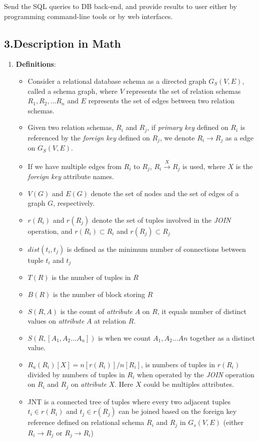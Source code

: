 Send the SQL queries to DB back-end, and provide results to user either by programming command-line tools or by web interfaces.
\begin{center}
{\section*{{\normalsize\bf 3.Description in Math}}}
\end{center}
\begin{enumerate}
\item {\bf Definitions}:
  \begin{itemize}
  \item Consider a relational database schema as a directed graph $G_S(V,E)$, called a schema graph, where $V$ represents the set of relation schemas ${R_1, R_2, ... R_n}$ and $E$ represents the set of edges between two relation schemas.
  \item Given two relation schemas, $R_i$ and $R_j$, if {\it primary key} defined on $R_i$ is referenced by the {\it foreign key} defined on $R_j$, we denote $R_i \rightarrow R_j$ as a edge on $G_S(V,E)$.
  \item If we have multiple edges from $R_i$ to $R_j$, $R_i \stackrel{X}{\longrightarrow} R_j$ is used, where $X$ is the {\it foreign key} attribute names.
  \item $V(G)$ and $E(G)$ denote the set of nodes and the set of edges of a graph $G$, respectively.
  \item $r(R_i)$ and $r(R_j)$ denote the set of tuples involved in the {\it JOIN} operation, and $r(R_i) \subset R_i$ and $r(R_j) \subset R_j$
  \item $dist(t_i,t_j)$ is defined as the minimum number of connections between tuple $t_i$ and $t_j$
  \item $T(R)$ is the number of tuples in $R$
  \item $B(R)$ is the number of block storing $R$
  \item $S(R, A)$ is the count of {\it attribute} $A$ on $R$, it equals number of distinct values on {\it attribute} $A$ at relation $R$.
  \item $S(R, [A_1, A_2 ... A_n])$ is when we count $A_1, A_2  ... An$ together as a distinct value.
  \item $R_a(R_i)[X] = n[r(R_i)] / n[R_i]$, is numbers of tuples in $r(R_i)$ divided by numbers of tuples in $R_i$ when operated by the {\it JOIN} operation on $R_i$ and $R_j$ on {\it attribute} $X$. Here $X$ could be multiples attributes.
  \item JNT is a connected tree of tuples where every two adjacent tuples $t_i \in r(R_i)$ and $t_j \in r(R_j)$ can be joined based on the foreign key reference defined on relational schema $R_i$ and $R_j$ in $G_s(V,E)$ (either $R_i \rightarrow R_j$ or $R_j \rightarrow R_i$)

\end{itemize}
\end{enumerate}
